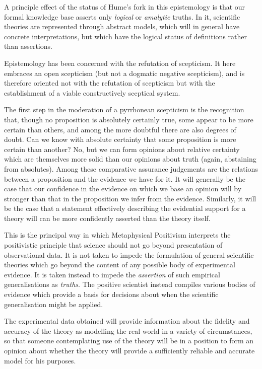 A principle effect of the status of Hume's fork in this epistemology
is that our formal knowledge base asserts only \emph{logical} or
\emph{amalytic} truths.
In it, scientific theories are represented through abstract models,
which will in general have concrete interpretations, but which have
the logical status of definitions rather than assertions.

Epistemology has been concerned with the refutation of scepticism.
It here embraces an open scepticism (but not a dogmatic negative
scepticism), and is therefore oriented not with the refutation of
scepticism but with the establishment of a viable constructively
sceptical system.

The first step in the moderation of a pyrrhonean scepticism is the
recognition that, though no proposition is absolutely certainly true,
some appear to be more certain than others, and among the more
doubtful there are also degrees of doubt.
Can we know with absolute certainty that some proposition is more
certain than another?
No, but we can form opinions about relative certainty which are
themselves more solid than our opinions about truth (again, abstaining
from absolutes).
Among these comparative assurance judgements are the relations between
a proposition and the evidence we have for it.
It will generally be the case that our confidence in the evidence on
which we base an opinion will by stronger than that in the proposition
we infer from the evidence.
Similarly, it will be the case that a statement effectively describing
the evidential support for a theory will can be more confidently
asserted than the theory itself.

This is the principal way in which Metaphysical Positivism interprets
the positivistic principle that science should not go beyond
presentation of observational data.
It is not taken to impede the formulation of general scientific
theories which go beyond the content of any possible body of
experimental evidence.
It is taken instead to impede the \emph{assertion} of such empirical
generalisations as \emph{truths}.
The positive scientist instead compiles various bodies of evidence
which provide a basis for decisions about when the scientific
generalisation might be applied.

The experimental data obtained will provide information about the
fidelity and accuracy of the theory as modelling the real world in a
variety of circumstances, so that someone contemplating use of the
theory will be in a position to form an opinion about whether the
theory will provide a sufficiently reliable and accurate model for his
purposes.


